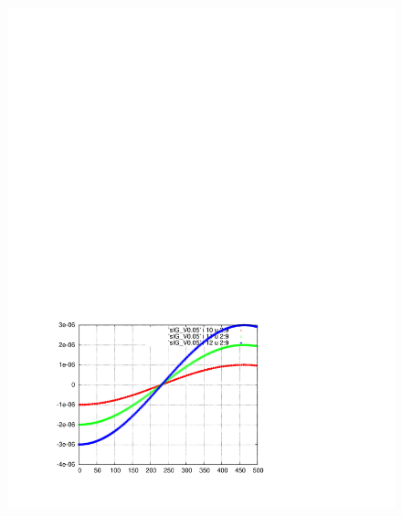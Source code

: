 \documentclass[]{article}
\begin{document}
\begin{figure}[h]
\begin{minipage}[b]{0.45\linewidth}
\includegraphics[scale=0.55]{pdf/delta_vs_turn_V0p05.pdf}
\end{minipage}
%
\hskip 1.5cm
%
\begin{minipage}[b]{0.45\linewidth}
\centering

\end{minipage}
\end{figure}
\end{document}
